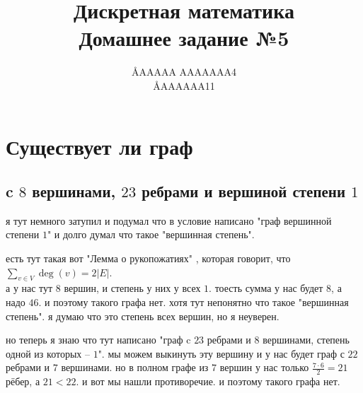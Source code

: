 \documentclass{article}
\title{Дискретная математика \\ Домашнее задание №5}
\author{\AA{AAAAA AAAAAAA}{4} \\ \AA{AAAAAA}{11}}
\newcommand{\ds}{\displaystyle}
\renewcommand{\f}{\frac}
\begin{document}
  \maketitle

  \section{Существует ли граф}
  \subsection{c $8$ вершинами, $23$ ребрами и вершиной степени $1$}
  я тут немного затупил и подумал что в условие написано "{}граф вершинной степени $1$"{}
  и долго думал что такое "{}вершинная степень"{}.
  \begin{cross}
    есть тут такая вот "{}Лемма о рукопожатиях"{} \cite{lem}, которая говорит, что $\ds \sum_{v\in V}\deg(v)=2|E|$. \\
    а у нас тут $8$ вершин, и степень у них у всех $1$.
    тоесть сумма у нас будет $8$, а надо $46$.
    и поэтому такого графа нет.
    хотя тут непонятно что такое "{}вершинная степень"{}.
    я думаю что это степень всех вершин, но я неуверен.
  \end{cross}

  но теперь я знаю что тут написано "{}граф c $23$ ребрами и $8$ вершинами, степень одной из которых -- $1$"{}.
  мы можем выкинуть эту вершину и у нас будет граф с $22$ ребрами и $7$ вершинами.
  но в полном графе из $7$ вершин у нас только $\f{7 \cdot 6}{2}=21$ рёбер, а $21 < 22$.
  и вот мы нашли противоречие.
  и поэтому такого графа нет.
\end{document}
